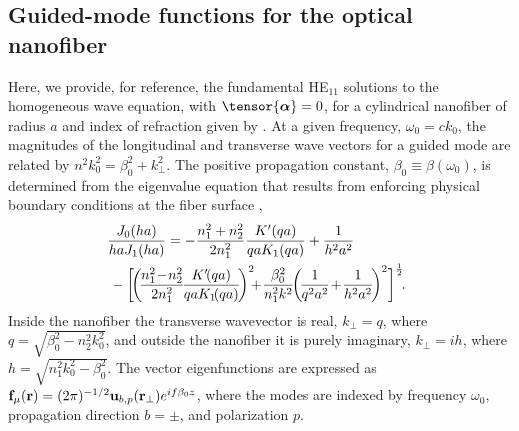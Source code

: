 \documentclass[aps,pra,twocolumn]{revtex4-1} %
\begin{document}
\begin{appendix}	


\section{Guided-mode functions for the optical nanofiber} \label{Appendix::ModeFunctions}


Here, we provide, for reference, the fundamental HE$_{11}$ solutions to the homogeneous wave equation,  with $\tensor{\boldsymbol{\alpha}} = 0$, for a cylindrical nanofiber of radius $a$ and index of refraction given by .  At a given frequency, $\omega_0 = c k_0$, the magnitudes of the longitudinal and transverse wave vectors for a guided mode are related by $n^2 k_0^2 = \beta_0^2 + k_\perp^2$.  
The positive propagation constant, $\beta_0 \equiv \beta(\omega_0)$, is determined from the eigenvalue equation that results from enforcing physical boundary conditions at the fiber surface \cite{snyder_optical_1983},
	\begin{align}
		\!\!\!& \frac{J_0(ha)}{ha J_1(ha)} = - \frac{n_1^2+n_2^2}{2n_1^2} \frac{K'(qa)}{qa K_1(qa)} + \frac{1}{h^2 a^2} \nn\\
		\!\!\!\!\!\!\!\!&\, - \bigg[\! \bigg(\!\frac{n_1^2 \!-\! n_2^2}{2 n_1^2}\! \frac{K'\!(qa)}{qa K_1\!(qa)} \!\bigg)^2  \!\!\!+\! \frac{\beta_0^2}{n^2_1 k^2}\!\! \left(\!\frac{1}{q^2a^2} \!+\! \frac{1}{h^2a^2}\! \right)^2\! \bigg]^{\frac{1}{2}}\!.
	\end{align}
Inside the nanofiber the transverse wavevector is real, $k_\perp = q$, where $q=\sqrt{\beta_0^2- n_2^2k_0^2}$, and outside the nanofiber it is purely imaginary, $k_\perp = i h$, where $h=\sqrt{n_1^2 k_0^2 - \beta_0^2}$.  The vector eigenfunctions are expressed as $\mathbf{f}_{\mu}(\mathbf{r}) = (2\pi)^{-1/2}\mathbf{u}_{b,p}(\mathbf{r}_\perp) e^{i f \beta_0 z}$, where the modes are indexed by frequency $\omega_0$, propagation direction $b = \pm$, and polarization $p$.


\end{appendix}
\end{document}

